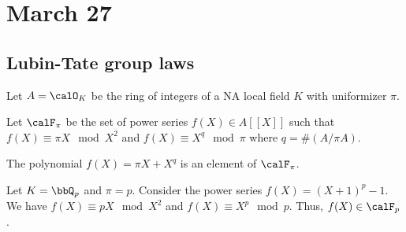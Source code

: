 \section{March 27}


\subsection{Lubin-Tate group laws}

  Let $A = \calO_K$ be the ring of integers of a NA local field $K$ with uniformizer $\pi$. 

  \begin{notation}
    Let $\calF_\pi$ be the set of power series $f(X) \in A[[X]]$ such that $f(X) \equiv \pi X \mod X^2$ and $f(X) \equiv X^q \mod \pi$ where $q = \#(A/\pi A)$. 
  \end{notation}

  \begin{example}
    The polynomial $f(X) = \pi X + X^q$ is an element of $\calF_\pi$.
  \end{example}

  \begin{example}
    Let $K = \bbQ_p$ and $\pi = p$. 
    Consider the power series $f(X) = (X + 1)^p - 1$. 
    We have $f(X) \equiv pX \mod X^2$ and $f(X) \equiv X^p \mod p$. 
    Thus, $f(X) \in \calF_p$.
  \end{example}

